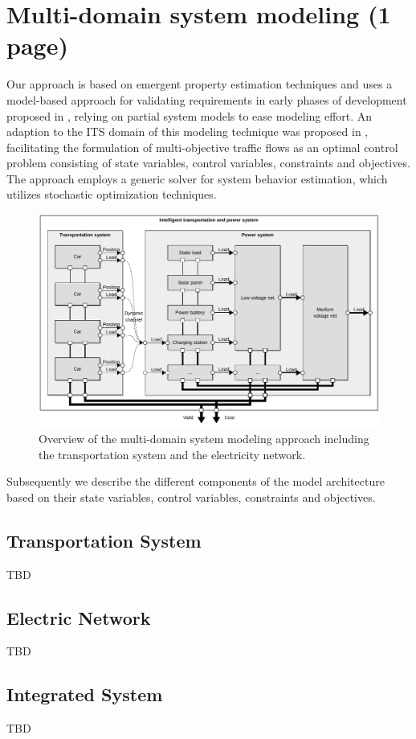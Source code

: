 \section{Multi-domain system modeling (1 page)}
\label{section:contribution_1}

Our approach is based on emergent property estimation techniques \cite{hackenberg2012towards} and uses a model-based approach for validating requirements in early phases of development proposed in \cite{hackenberg2014rapid}, relying on partial system models to ease modeling effort. An adaption to the ITS domain of this modeling technique was proposed in \cite{ascher2014early}, facilitating the formulation of multi-objective traffic flows as an optimal control problem consisting of state variables, control variables, constraints and objectives. The approach employs a generic solver for system behavior estimation, which utilizes stochastic optimization techniques.

\begin{figure}[h]
	\centering
	\includegraphics[width=\columnwidth]{../gfx/model.pdf}
	\caption{Overview of the multi-domain system modeling approach including the transportation system and the electricity network.}
	\label{fig:model}
\end{figure}

Subsequently we describe the different components of the model architecture based on their state variables, control variables, constraints and objectives. 

\subsection{Transportation System}

TBD

\subsection{Electric Network}

TBD

\subsection{Integrated System}

TBD